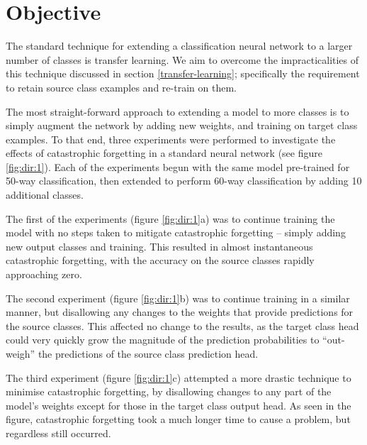 \documentclass{report}
\begin{document}
\section{Objective}
The standard technique for extending a classification neural network to a larger number of classes is transfer learning. We aim to overcome the impracticalities of this technique discussed in section \ref{transfer-learning}; specifically the requirement to retain source class examples and re-train on them. \par
The most straight-forward approach to extending a model to more classes is to simply augment the network by adding new weights, and training on target class examples. To that end, three experiments were performed to investigate the effects of catastrophic forgetting in a standard neural network (see figure \ref{fig:dir:1}). Each of the experiments begun with the same model pre-trained for 50-way classification, then extended to perform 60-way classification by adding 10 additional classes. \par
The first of the experiments (figure \ref{fig:dir:1}a) was to continue training the model with no steps taken to mitigate catastrophic forgetting -- simply adding new output classes and training. This resulted in almost instantaneous catastrophic forgetting, with the accuracy on the source classes rapidly approaching zero. \par
The second experiment (figure \ref{fig:dir:1}b) was to continue training in a similar manner, but disallowing any changes to the weights that provide predictions for the source classes. This affected no change to the results, as the target class head could very quickly grow the magnitude of the prediction probabilities to ``out-weigh'' the predictions of the source class prediction head. \par
The third experiment (figure \ref{fig:dir:1}c) attempted a more drastic technique to minimise catastrophic forgetting, by disallowing changes to any part of the model's weights except for those in the target class output head. As seen in the figure, catastrophic forgetting took a much longer time to cause a problem, but regardless still occurred. \par
\end{document}
